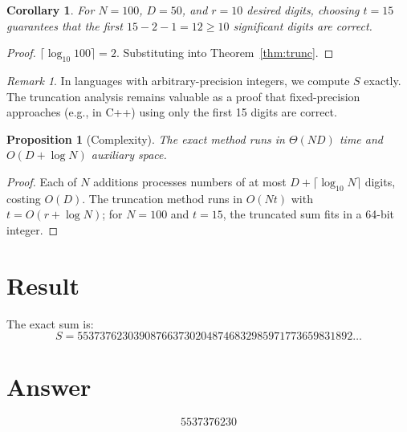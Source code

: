 \documentclass[12pt]{article}
\newtheorem{corollary}[theorem]{Corollary}
\newtheorem{proposition}[theorem]{Proposition}
\theoremstyle{definition}
\theoremstyle{remark}
\newtheorem{remark}[theorem]{Remark}
\begin{document}
\begin{corollary}
For $N = 100$, $D = 50$, and $r = 10$ desired digits, choosing $t = 15$ guarantees that the first $15 - 2 - 1 = 12 \ge 10$ significant digits are correct.
\end{corollary}

\begin{proof}
$\lceil \log_{10} 100 \rceil = 2$. Substituting into Theorem~\ref{thm:trunc}.
\end{proof}

\begin{remark}
In languages with arbitrary-precision integers, we compute $S$ exactly. The truncation analysis remains valuable as a proof that fixed-precision approaches (e.g., in C++) using only the first 15 digits are correct.
\end{remark}

\begin{proposition}[Complexity]
The exact method runs in $\Theta(ND)$ time and $O(D + \log N)$ auxiliary space.
\end{proposition}

\begin{proof}
Each of $N$ additions processes numbers of at most $D + \lceil \log_{10} N \rceil$ digits, costing $O(D)$. The truncation method runs in $O(Nt)$ with $t = O(r + \log N)$; for $N = 100$ and $t = 15$, the truncated sum fits in a 64-bit integer.
\end{proof}

\section{Result}

The exact sum is:
\[
S = 5537376230390876637302048746832985971773659831892\ldots
\]

\section{Answer}

\[
\boxed{5537376230}
\]
\end{document}
